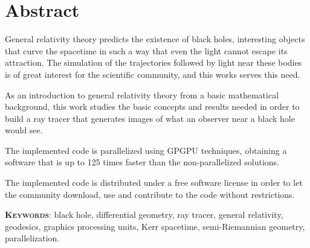 \begingroup
\let\clearpage\relax
\let\cleardoublepage\relax
\let\cleardoublepage\relax

\chapter*{Abstract}
General relativity theory predicts the existence of black holes, interesting objects that curve the spacetime in such a way that even the light cannot escape its attraction. The simulation of the trajectories followed by light near these bodies is of great interest for the scientific community, and this works serves this need.

As an introduction to general relativity theory from a basic mathematical background, this work studies the basic concepts and results needed in order to build a ray tracer that generates images of what an observer near a black hole would see.

The implemented code is parallelized using \ac{GPGPU} techniques, obtaining a software that is up to 125 times faster than the non-parallelized solutions.

The implemented code is distributed under a free software license in order to let the community download, use and contribute to the code without restrictions.

\vfill

\endgroup

\vfill

\textsc{\textbf{Keywords}}: black hole, differential geometry, ray tracer, general relativity, geodesics, graphics processing units, Kerr spacetime, semi-Riemannian geometry, parallelization.
